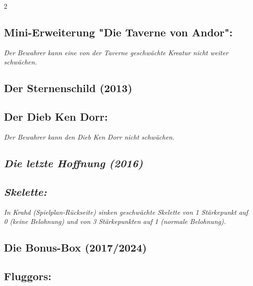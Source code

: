 \documentclass[10pt, a4paper, oneside]{book}
\newcommand{\fan}[1]{\textit{#1}}
\begin{document}
\begin{multicols*}{2}
\begin{bgcolor}
\subsection{Mini-Erweiterung "Die Taverne von Andor":} 

\fan{Der Bewahrer kann eine von der Taverne geschwächte Kreatur nicht weiter schwächen.}

\end{bgcolor}



\columnbreak

\begin{bgcolor}
\section{Der Sternenschild (2013)}

\subsection{Der Dieb Ken Dorr:}

\fan{Der Bewahrer kann den Dieb Ken Dorr nicht schwächen.}

\end{bgcolor}



\begin{bgcolor}
\section{\fan{Die letzte Hoffnung (2016)}}

\subsection{\fan{Skelette:}}


\fan{In Krahd (Spielplan-Rückseite) sinken geschwächte Skelette von 1 Stärkepunkt auf 0 (keine Belohnung) und von 3 Stärkepunkten auf 1 (normale Belohnung).}

\end{bgcolor}



\begin{bgcolor}[color-bb]
\section{Die Bonus-Box (2017/2024)}

\subsection{Fluggors:}


\end{bgcolor}
\end{multicols*}
\end{document}
